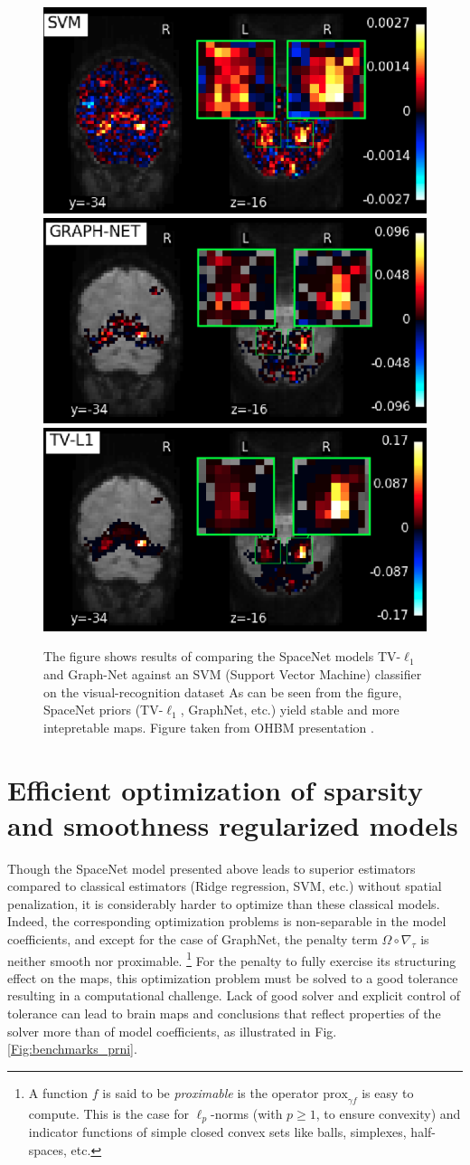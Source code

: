   \begin{figure}[!htb] 
  \includegraphics[width=.325\linewidth]{figures/svm.png}
  \includegraphics[width=.325\linewidth]{figures/graphnet.png}
  \includegraphics[width=.325\linewidth]{figures/tvl1.png}  
  \caption{The figure shows results of comparing the SpaceNet  models TV-$\ell_1$ and
    Graph-Net against an SVM (Support Vector Machine) classifier on
    the visual-recognition dataset  \citep{haxby2001}
    As can be seen from the figure, SpaceNet priors (TV-$\ell_1$, GraphNet, etc.)
    yield stable and more intepretable maps. Figure taken from OHBM
    presentation  \citep{spacenetohbm}.}
  \label{fig:spacenet_maps}
\end{figure}

\section{Efficient optimization of sparsity and smoothness regularized models}
Though the SpaceNet model presented above leads to superior estimators compared to classical estimators (Ridge regression, SVM, etc.) without spatial penalization, it is considerably harder to optimize than these classical models. Indeed, the corresponding optimization problems is non-separable in the model coefficients, and except for the case of GraphNet,
the penalty term $\Omega \circ \nabla_\tau$ is neither smooth nor proximable.
\footnote{ A function $f$ is said to be \textit{proximable} is the operator $\text{prox}_{\gamma f}$ is easy to compute. This is the case for $\ell_p$-norms  (with $ p \ge 1$, to ensure convexity) and indicator functions of simple closed convex sets like balls, simplexes, half-spaces, etc.}
For the penalty to fully exercise its
structuring effect on the maps, this optimization problem must be
solved to a good tolerance resulting in a computational challenge. Lack of good solver and explicit control of
tolerance can lead to brain maps and conclusions that reflect
properties of the solver more than of model coefficients, as illustrated in Fig. \ref{Fig:benchmarks_prni}.

